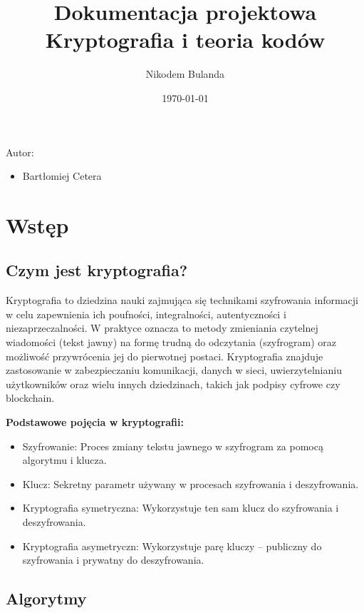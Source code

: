 \documentclass[12pt,a4paper]{article}
\begin{document}
\title{Dokumentacja projektowa Kryptografia i teoria kodów}
\author{Nikodem Bulanda}
\date{\today}

\maketitle


Autor:
\begin{itemize}
\item[] Bartłomiej Cetera
\end{itemize}


\newpage

\tableofcontents


\newpage
\section{Wstęp}

\subsection{Czym jest kryptografia?}
\noindent Kryptografia to dziedzina nauki zajmująca się technikami szyfrowania informacji w celu zapewnienia ich poufności, integralności, autentyczności i niezaprzeczalności. W praktyce oznacza to metody zmieniania czytelnej wiadomości (tekst jawny) na formę trudną do odczytania (szyfrogram) oraz możliwość przywrócenia jej do pierwotnej postaci. Kryptografia znajduje zastosowanie w zabezpieczaniu komunikacji, danych w sieci, uwierzytelnianiu użytkowników oraz wielu innych dziedzinach, takich jak podpisy cyfrowe czy blockchain.\newline

\textbf{Podstawowe pojęcia w kryptografii:}
\begin{itemize}
\item Szyfrowanie: Proces zmiany tekstu jawnego w szyfrogram za pomocą algorytmu i klucza.
\item Klucz: Sekretny parametr używany w procesach szyfrowania i deszyfrowania.
\item Kryptografia symetryczna: Wykorzystuje ten sam klucz do szyfrowania i deszyfrowania.
\item Kryptografia asymetryczn: Wykorzystuje parę kluczy – publiczny do szyfrowania i prywatny do deszyfrowania.
\end{itemize}

\subsection{Algorytmy}
\end{document}
